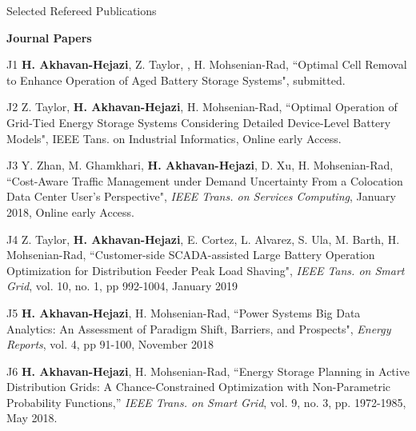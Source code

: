 \documentclass{resume} %
\begin{document}
\begin{rSection}{ Selected Refereed Publications}

{\bf Journal Papers}
\item [J1]  {\bf H.  Akhavan-Hejazi}, Z. Taylor, ,  H. Mohsenian-Rad, ``Optimal Cell Removal to Enhance Operation of Aged Battery Storage Systems",  submitted. 

\item [J2]  Z. Taylor, {\bf H.  Akhavan-Hejazi},  H. Mohsenian-Rad, ``Optimal Operation of Grid-Tied Energy Storage Systems Considering Detailed Device-Level Battery Models", IEEE Tans. on Industrial Informatics, Online early Access. 

\item [J3]	Y. Zhan, M. Ghamkhari, {\bf H. Akhavan-Hejazi}, D. Xu, H. Mohsenian-Rad, ``Cost-Aware Traffic Management under Demand Uncertainty From a Colocation Data Center User's Perspective", \emph{IEEE Trans. on Services Computing},   January 2018, Online early Access. 

 \item [J4]  Z. Taylor, {\bf H.  Akhavan-Hejazi}, E. Cortez, L.  Alvarez,  S. Ula,  M. Barth,  H. Mohsenian-Rad, ``Customer-side SCADA-assisted Large Battery Operation Optimization for Distribution Feeder Peak Load Shaving",\emph{ IEEE Tans. on Smart Grid}, vol. 10, no. 1, pp 992-1004, January 2019
 
\item [J5] {\bf H. Akhavan-Hejazi}, H. Mohsenian-Rad, ``Power Systems Big Data Analytics: An Assessment of Paradigm Shift, Barriers, and Prospects",   \emph{Energy  Reports},  vol. 4, pp 91-100, November 2018
  

 
 \item [J6] {\bf H. Akhavan-Hejazi},  H. Mohsenian-Rad, ``Energy Storage Planning in Active Distribution Grids: A Chance-Constrained Optimization with Non-Parametric Probability Functions,'' \emph{IEEE Trans. on Smart Grid}, vol. 9, no. 3, pp. 1972-1985, May 2018.





\end{rSection}
\end{document}
